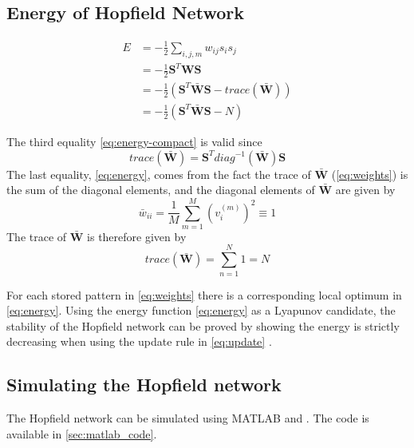 \subsection{Energy of Hopfield Network}
\begin{tcolorbox}
    \begin{subequations}\label{eq:energy}
        \begin{align}
        E &= -\frac{1}{2} \sum_{i,j,m} w_{ij}s_i s_j \\
        &= - \frac{1}{2} \mathbf{S}^T \mathbf{W} \mathbf{S} \\
        &= -\frac{1}{2}( \mathbf{S}^T \bar{\mathbf{W}} \mathbf{S} - trace(\bar{\mathbf{W}})) \label{eq:energy-trace} \\ 
        &= -\frac{1}{2}(\mathbf{S}^T \bar{\mathbf{W}} \mathbf{S} - N) \label{eq:energy-compact}
        \end{align}
    \end{subequations}
\end{tcolorbox}
The third equality \cref{eq:energy-compact} is valid since 
\begin{equation}
    trace(\bar{\mathbf{W}}) = \mathbf{S}^T diag^{-1}(\bar{\mathbf{W}})\mathbf{S}
\end{equation}
The last equality, \cref{eq:energy}, comes from the fact the trace of $\bar{\mathbf{W}}$ (\cref{eq:weights}) is the sum of the diagonal elements, and the diagonal elements of $\bar{\mathbf{W}}$ are given by
\begin{equation}
    \bar{w}_{ii} = \frac{1}{M} \sum_{m=1}^M (v_i^{(m)})^2 \equiv 1
\end{equation}
The trace of $\bar{\mathbf{W}}$ is therefore given by 
\begin{equation}
    trace(\bar{\mathbf{W}}) = \sum_{n=1}^N 1 = N
\end{equation}

For each stored pattern in \cref{eq:weights} there is a corresponding local optimum in \cref{eq:energy}.
Using the energy function \cref{eq:energy} as a Lyapunov candidate, the stability of the Hopfield network can be proved by showing the energy is strictly decreasing when using the update rule in \cref{eq:update} \cite{lyapnuv-stability}.




\subsection{Simulating the Hopfield network}
The Hopfield network can be simulated using MATLAB and . The code is available in \cref{sec:matlab_code}.
